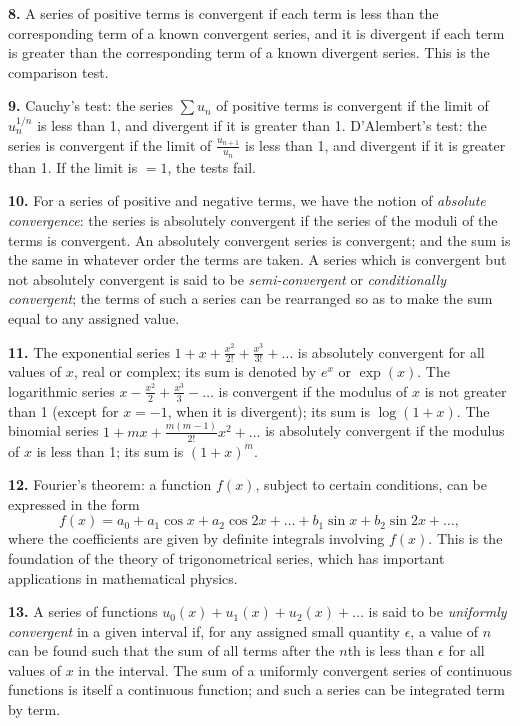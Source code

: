 \documentclass[11pt,a4paper]{article}
\begin{document}
\textbf{8.}\quad
A series of positive terms is convergent if each term is less than the corresponding term of a known convergent series, and it is divergent if each term is greater than the corresponding term of a known divergent series. This is the comparison test.

\textbf{9.}\quad
Cauchy's test: the series $\sum u_{n}$ of positive terms is convergent if the limit of $u_{n}^{1/n}$ is less than 1, and divergent if it is greater than 1. D'Alembert's test: the series is convergent if the limit of $\frac{u_{n+1}}{u_{n}}$ is less than 1, and divergent if it is greater than 1. If the limit is $= 1$, the tests fail.

\textbf{10.}\quad
For a series of positive and negative terms, we have the notion of \textit{absolute convergence}: the series is absolutely convergent if the series of the moduli of the terms is convergent. An absolutely convergent series is convergent; and the sum is the same in whatever order the terms are taken. A series which is convergent but not absolutely convergent is said to be \textit{semi-convergent} or \textit{conditionally convergent}; the terms of such a series can be rearranged so as to make the sum equal to any assigned value.

\textbf{11.}\quad
The exponential series $1 + x + \frac{x^{2}}{2!} + \frac{x^{3}}{3!} + \ldots$ is absolutely convergent for all values of $x$, real or complex; its sum is denoted by $e^{x}$ or $\exp(x)$. The logarithmic series $x - \frac{x^{2}}{2} + \frac{x^{3}}{3} - \ldots$ is convergent if the modulus of $x$ is not greater than 1 (except for $x = -1$, when it is divergent); its sum is $\log(1 + x)$. The binomial series $1 + mx + \frac{m(m-1)}{2!}x^{2} + \ldots$ is absolutely convergent if the modulus of $x$ is less than 1; its sum is $(1 + x)^{m}$.

\textbf{12.}\quad
Fourier's theorem: a function $f(x)$, subject to certain conditions, can be expressed in the form
\[
f(x) = a_{0} + a_{1}\cos x + a_{2}\cos 2x + \ldots + b_{1}\sin x + b_{2}\sin 2x + \ldots,
\]
where the coefficients are given by definite integrals involving $f(x)$. This is the foundation of the theory of trigonometrical series, which has important applications in mathematical physics.

\textbf{13.}\quad
A series of functions $u_{0}(x) + u_{1}(x) + u_{2}(x) + \ldots$ is said to be \textit{uniformly convergent} in a given interval if, for any assigned small quantity $\epsilon$, a value of $n$ can be found such that the sum of all terms after the $n$th is less than $\epsilon$ for all values of $x$ in the interval. The sum of a uniformly convergent series of continuous functions is itself a continuous function; and such a series can be integrated term by term.
\end{document}
